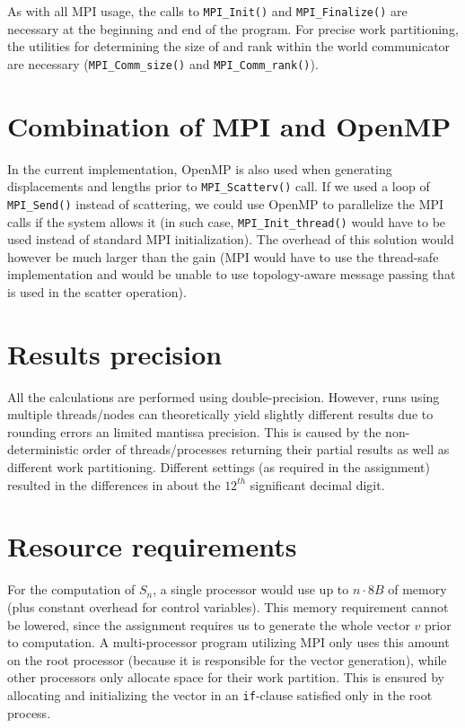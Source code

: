 \documentclass[12pt]{simple-assignment} %
\begin{document}
As with all MPI usage, the calls to \texttt{MPI\_Init()} and \texttt{MPI\_Finalize()} are necessary at the beginning and end of the program. For precise work partitioning, the utilities for determining the size of and rank within the world communicator are necessary (\texttt{MPI\_Comm\_size()} and \texttt{MPI\_Comm\_rank()}).

\section{Combination of MPI and OpenMP}
In the current implementation, OpenMP is also used when generating displacements and lengths prior to \texttt{MPI\_Scatterv()} call. If we used a loop of \texttt{MPI\_Send()} instead of scattering, we could use OpenMP to parallelize the MPI calls if the system allows it (in such case, \texttt{MPI\_Init\_thread()} would have to be used instead of standard MPI initialization). The overhead of this solution would however be much larger than the gain (MPI would have to use the thread-safe implementation and would be unable to use topology-aware message passing that is used in the scatter operation).

\section{Results precision}
All the calculations are performed using double-precision. However, runs using multiple threads/nodes can theoretically yield slightly different results due to rounding errors an limited mantissa precision. This is caused by the non-deterministic order of threads/processes returning their partial results as well as different work partitioning. Different settings (as required in the assignment) resulted in the differences in about the $12^{th}$ significant decimal digit.

\section{Resource requirements}
For the computation of $S_n$, a single processor would use up to $n \cdot 8B$ of memory (plus constant overhead for control variables). This memory requirement cannot be lowered, since the assignment requires us to generate the whole vector $v$ prior to computation. A multi-processor program utilizing MPI only uses this amount on the root processor (because it is responsible for the vector generation), while other processors only allocate space for their work partition. This is ensured by allocating and initializing the vector in an \texttt{if}-clause satisfied only in the root process. 
\end{document}
